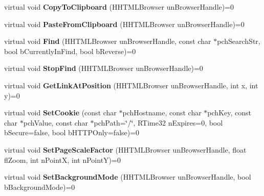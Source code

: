 \begin{DoxyCompactItemize}
\item 
\mbox{\label{class_i_steam_h_t_m_l_surface_a8880e87740ef539e588535dfc54b2e8b}} 
virtual void {\bfseries Copy\+To\+Clipboard} (H\+H\+T\+M\+L\+Browser un\+Browser\+Handle)=0
\item 
\mbox{\label{class_i_steam_h_t_m_l_surface_a8923f897b61da1a9f04aecf318581b31}} 
virtual void {\bfseries Paste\+From\+Clipboard} (H\+H\+T\+M\+L\+Browser un\+Browser\+Handle)=0
\item 
\mbox{\label{class_i_steam_h_t_m_l_surface_a22fdef649c5e93065f6ac45a23c30530}} 
virtual void {\bfseries Find} (H\+H\+T\+M\+L\+Browser un\+Browser\+Handle, const char $\ast$pch\+Search\+Str, bool b\+Currently\+In\+Find, bool b\+Reverse)=0
\item 
\mbox{\label{class_i_steam_h_t_m_l_surface_afaf9dd99a4f51d7ad77620ba0a3d01df}} 
virtual void {\bfseries Stop\+Find} (H\+H\+T\+M\+L\+Browser un\+Browser\+Handle)=0
\item 
\mbox{\label{class_i_steam_h_t_m_l_surface_aa98e035eb1ea88e31152dee37778a2d9}} 
virtual void {\bfseries Get\+Link\+At\+Position} (H\+H\+T\+M\+L\+Browser un\+Browser\+Handle, int x, int y)=0
\item 
\mbox{\label{class_i_steam_h_t_m_l_surface_a096761fa5e8192de18bd2b01eb1a4736}} 
virtual void {\bfseries Set\+Cookie} (const char $\ast$pch\+Hostname, const char $\ast$pch\+Key, const char $\ast$pch\+Value, const char $\ast$pch\+Path=\char`\"{}/\char`\"{}, R\+Time32 n\+Expires=0, bool b\+Secure=false, bool b\+H\+T\+T\+P\+Only=false)=0
\item 
\mbox{\label{class_i_steam_h_t_m_l_surface_ad0ac9b5af995492c4f86df37744931de}} 
virtual void {\bfseries Set\+Page\+Scale\+Factor} (H\+H\+T\+M\+L\+Browser un\+Browser\+Handle, float fl\+Zoom, int n\+PointX, int n\+PointY)=0
\item 
\mbox{\label{class_i_steam_h_t_m_l_surface_aabfc7673e6f7dfddcc1002d3a4865de6}} 
virtual void {\bfseries Set\+Background\+Mode} (H\+H\+T\+M\+L\+Browser un\+Browser\+Handle, bool b\+Background\+Mode)=0

\end{DoxyCompactItemize}
